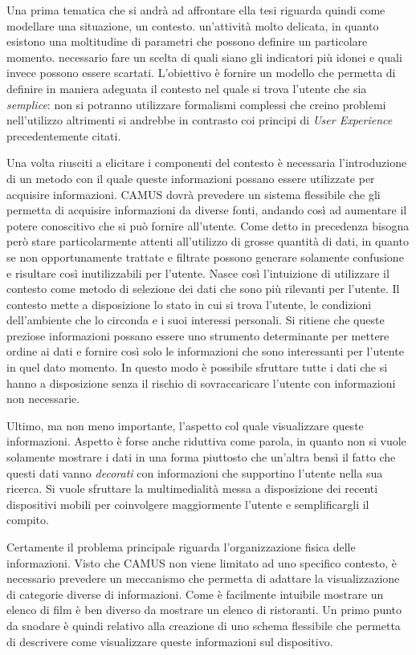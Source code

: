 Una prima tematica che si andrà ad affrontare ella tesi riguarda quindi come modellare una situazione, un contesto. \upe un'attività molto delicata, in quanto esistono una moltitudine di parametri che possono definire un particolare momento. \upe necessario fare un scelta di quali siano gli indicatori più idonei e quali invece possono essere scartati. L'obiettivo è fornire un modello che permetta di definire in maniera adeguata il contesto nel quale si trova l'utente che sia \emph{semplice}: non si potranno utilizzare formalismi complessi che creino problemi nell'utilizzo altrimenti si andrebbe in contrasto coi principi di \emph{User Experience} precedentemente citati.

Una volta riusciti a elicitare i componenti del contesto è necessaria l'introduzione di un metodo con il quale queste informazioni possano essere utilizzate per acquisire informazioni. CAMUS dovrà prevedere un sistema flessibile che gli permetta di acquisire informazioni da diverse fonti, andando così ad aumentare il potere conoscitivo che si può fornire all'utente. Come detto in precedenza bisogna però stare particolarmente attenti all'utilizzo di grosse quantità di dati, in quanto se non opportunamente trattate e filtrate possono generare solamente confusione e risultare così inutilizzabili per l'utente. Nasce così l'intuizione di utilizzare il contesto come metodo di selezione dei dati che sono più rilevanti per l'utente. Il contesto mette a disposizione lo stato in cui si trova l'utente, le condizioni dell'ambiente che lo circonda e i suoi interessi personali. Si ritiene che queste preziose informazioni possano essere uno strumento determinante per mettere ordine ai dati e fornire così solo le informazioni che sono interessanti per l'utente in quel dato momento. In questo modo è possibile sfruttare tutte i dati che si hanno a disposizione senza il rischio di sovraccaricare l'utente con informazioni non necessarie.

Ultimo, ma non meno importante, l'aspetto col quale visualizzare queste informazioni. Aspetto è forse anche riduttiva come parola, in quanto non si vuole solamente mostrare i dati in una forma piuttosto che un'altra bensì il fatto che questi dati vanno \emph{decorati} con informazioni che supportino l'utente nella sua ricerca. Si vuole sfruttare la multimedialità messa a disposizione dei recenti dispositivi mobili per coinvolgere maggiormente l'utente e semplificargli il compito.

Certamente il problema principale riguarda l'organizzazione fisica delle informazioni. Visto che CAMUS non viene limitato ad uno specifico contesto, è necessario prevedere un meccanismo che permetta di adattare la visualizzazione di categorie diverse di informazioni. Come è facilmente intuibile mostrare un elenco di film è ben diverso da mostrare un elenco di ristoranti. Un primo punto da snodare è quindi relativo alla creazione di uno schema flessibile che permetta di descrivere come visualizzare queste informazioni sul dispositivo.

